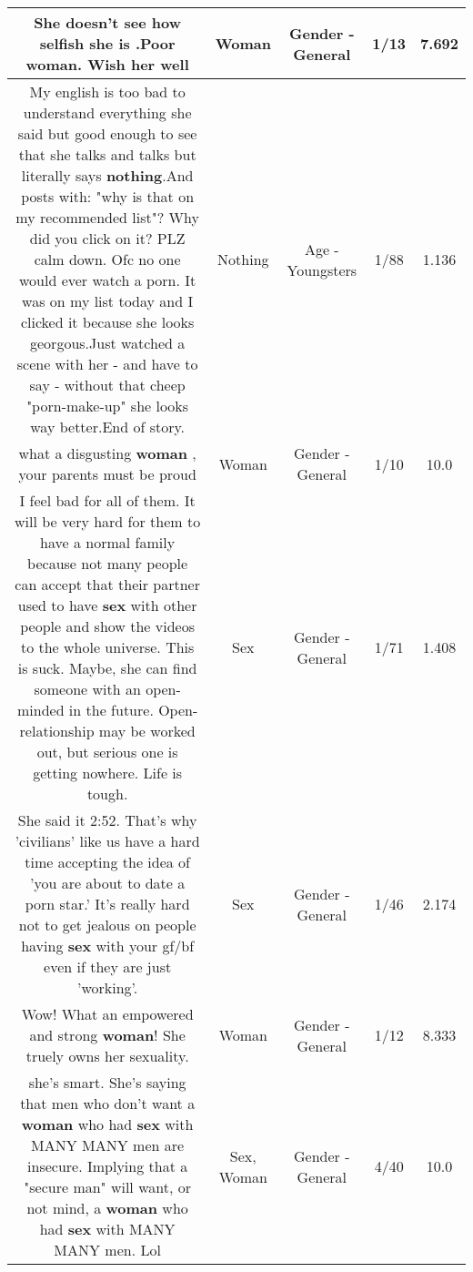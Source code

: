 \documentclass[11pt]{article}
\newlength\mylength
\begin{document}
\begin{center}
\begin{longtable}{|C{.65\mylength}|C{.30\mylength}|C{.12\mylength}|C{.12\mylength}|C{.12\mylength}|}
  \small She doesn't see how selfish she is .Poor \textbf{woman}. Wish her well\normalsize   & Woman & Gender - General & 1/13 & 7.692 \\  \hline
  \small My english is too bad to understand everything she said but good enough to see that she talks and talks but literally says \textbf{nothing}.And posts with: "why is that on my recommended list"? Why did you click on it? PLZ calm down. Ofc no one would ever watch a porn. It was on my list today and I clicked it because she looks georgous.Just watched a scene with her - and have to say - without that cheep "porn-make-up" she looks way better.End of story.\normalsize   & Nothing & Age - Youngsters & 1/88 & 1.136 \\  \hline
  \small what a disgusting \textbf{woman} , your parents must be proud\normalsize   & Woman & Gender - General & 1/10 & 10.0 \\  \hline
  \small I feel bad for all of them. It will be very hard for them to have a normal family because not many people can accept that their partner used to have \textbf{sex} with other people and show the videos to the whole universe. This is suck. Maybe, she can find someone with an open-minded in the future. Open-relationship may be worked out, but serious one is getting nowhere. Life is tough.\normalsize   & Sex & Gender - General & 1/71 & 1.408 \\  \hline
  \small She said it \@ 2:52. That's why 'civilians' like us have a hard time accepting the idea of 'you are about to date a porn star.' It's really hard not to get jealous on people having \textbf{sex} with your gf/bf even if they are just 'working'.\normalsize   & Sex & Gender - General & 1/46 & 2.174 \\  \hline
  \small Wow!  What an empowered and strong \textbf{woman}!  She truely owns her sexuality.\normalsize   & Woman & Gender - General & 1/12 & 8.333 \\  \hline
  \small she's smart. She's saying that men who don't want a \textbf{woman} who had \textbf{sex} with MANY MANY men are insecure. Implying that a "secure man" will want, or not mind, a \textbf{woman} who had \textbf{sex} with MANY MANY men. Lol\normalsize   & Sex, Woman & Gender - General & 4/40 & 10.0 \\  \hline

\end{longtable}
\end{center}
\end{document}
